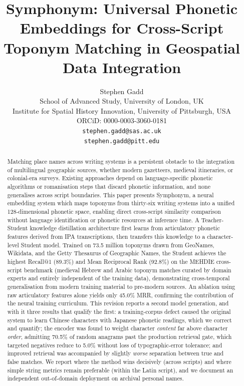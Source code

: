 \documentclass[11pt,a4paper]{article}
\title{Symphonym: Universal Phonetic Embeddings for Cross-Script Toponym Matching in Geospatial Data Integration}
\author{Stephen Gadd\\
\small School of Advanced Study, University of London, UK\\
\small Institute for Spatial History Innovation, University of Pittsburgh, USA\\
\small ORCiD: 0000-0003-3060-0181\\
\small \texttt{stephen.gadd@sas.ac.uk}\\
\small \texttt{stephen.gadd@pitt.edu}}
\date{}
\begin{document}
\maketitle

\begin{abstract}
Matching place names across writing systems is a persistent obstacle to the integration of multilingual geographic sources, whether modern gazetteers, medieval itineraries, or colonial-era surveys. Existing approaches depend on language-specific phonetic algorithms or romanisation steps that discard phonetic information, and none generalises across script boundaries. This paper presents Symphonym, a neural embedding system which maps toponyms from thirty-six writing systems into a unified 128-dimensional phonetic space, enabling direct cross-script similarity comparison without language identification or phonetic resources at inference time. A Teacher-Student knowledge distillation architecture first learns from articulatory phonetic features derived from IPA transcriptions, then transfers this knowledge to a character-level Student model. Trained on 73.5 million toponyms drawn from GeoNames, Wikidata, and the Getty Thesaurus of Geographic Names, the Student achieves the highest Recall@1 (89.3\%) and Mean Reciprocal Rank (92.8\%) on the MEHDIE cross-script benchmark (medieval Hebrew and Arabic toponym matches curated by domain experts and entirely independent of the training data), demonstrating cross-temporal generalisation from modern training material to pre-modern sources. An ablation using raw articulatory features alone yields only 45.0\% MRR, confirming the contribution of the neural training curriculum. This revision reports a second model generation, and with it three results that qualify the first: a training-corpus defect caused the original system to learn Chinese characters with Japanese phonetic readings, which we correct and quantify; the encoder was found to weight character \emph{content} far above character \emph{order}, admitting 70.5\% of random anagrams past the production retrieval gate, which targeted negatives reduce to 5.0\% without loss of typographic-error tolerance; and improved retrieval was accompanied by slightly \emph{worse} separation between true and false matches. We report where the method wins decisively (across scripts) and where simple string metrics remain preferable (within the Latin script), and we document an independent out-of-domain deployment on archival personal names.
\end{abstract}
\end{document}

